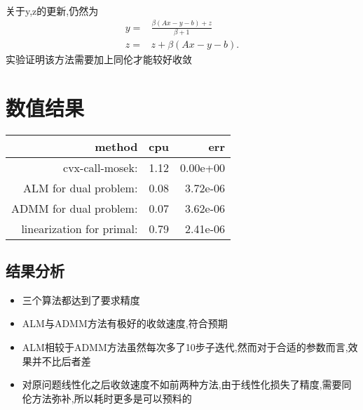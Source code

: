 \documentclass[UTF8]{ctexart}
\begin{document}
\paragraph{}
关于y,z的更新,仍然为
 $$
  \begin{aligned}
   y =& \frac{\beta(Ax-y-b)+z}{\beta + 1}\\
   z =& z+ \beta (Ax-y-b).
\end{aligned}
$$
实验证明该方法需要加上同伦才能较好收敛
\section{数值结果}
  \begin{tabular}{|r|r|r|}
\hline
method & cpu & err\\ \hline
                 cvx-call-mosek:  & 1.12& 0.00e+00\\
           ALM for dual problem:  &0.08 & 3.72e-06\\
          ADMM for dual problem:  & 0.07 &3.62e-06\\
  linearization for primal: & 0.79 & 2.41e-06\\
\hline
\end{tabular}
\subsection{结果分析}

\begin{itemize}
  \item 三个算法都达到了要求精度
  \item ALM与ADMM方法有极好的收敛速度,符合预期
  \item ALM相较于ADMM方法虽然每次多了10步子迭代,然而对于合适的参数而言,效果并不比后者差
  \item 对原问题线性化之后收敛速度不如前两种方法,由于线性化损失了精度,需要同伦方法弥补,所以耗时更多是可以预料的
  \end{itemize}
  
\end{document}
